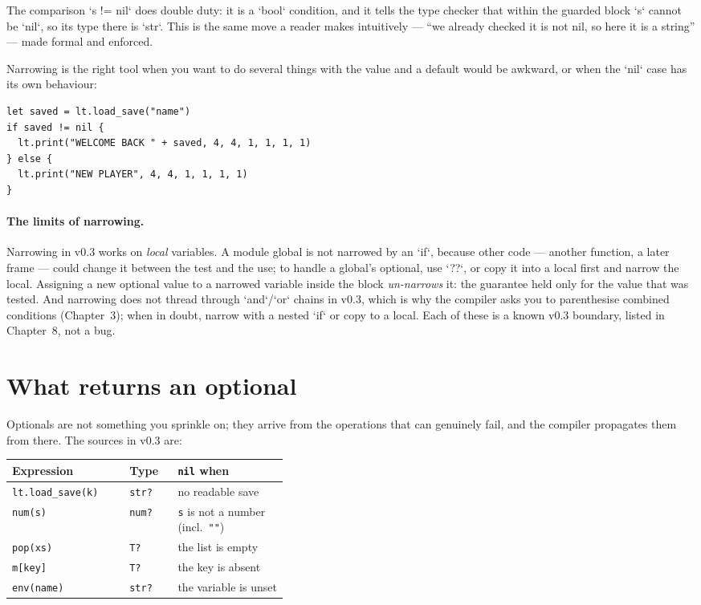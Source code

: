 \noindent
The comparison `s != nil` does double duty: it is a `bool` condition, and it
tells the type checker that within the guarded block `s` cannot be `nil`, so
its type there is `str`. This is the same move a reader makes intuitively ---
``we already checked it is not nil, so here it is a string'' --- made formal
and enforced.

Narrowing is the right tool when you want to do several things with the value
and a default would be awkward, or when the `nil` case has its own behaviour:

\begin{lstlisting}[language=wick]
let saved = lt.load_save("name")
if saved != nil {
  lt.print("WELCOME BACK " + saved, 4, 4, 1, 1, 1, 1)
} else {
  lt.print("NEW PLAYER", 4, 4, 1, 1, 1, 1)
}
\end{lstlisting}

\paragraph{The limits of narrowing.} Narrowing in v0.3 works on \emph{local}
variables. A module global is not narrowed by an `if`, because other code ---
another function, a later frame --- could change it between the test and the
use; to handle a global's optional, use `??`, or copy it into a local first
and narrow the local. Assigning a new optional value to a narrowed variable
inside the block \emph{un-narrows} it: the guarantee held only for the value
that was tested. And narrowing does not thread through `and`/`or` chains in
v0.3, which is why the compiler asks you to parenthesise combined conditions
(Chapter~3); when in doubt, narrow with a nested `if` or copy to a local. Each
of these is a known v0.3 boundary, listed in Chapter~8, not a bug.

\section{What returns an optional}

Optionals are not something you sprinkle on; they arrive from the operations
that can genuinely fail, and the compiler propagates them from there. The
sources in v0.3 are:

\begin{center}
\begin{tabular}{@{}llp{0.40\linewidth}@{}}
\toprule
\textbf{Expression} & \textbf{Type} & \textbf{\texttt{nil} when} \\
\midrule
\texttt{lt.load\_save(k)} & \texttt{str?} & no readable save \\
\texttt{num(s)} & \texttt{num?} & \texttt{s} is not a number (incl.\ \texttt{""}) \\
\texttt{pop(xs)} & \texttt{T?} & the list is empty \\
\texttt{m[key]} & \texttt{T?} & the key is absent \\
\texttt{env(name)} & \texttt{str?} & the variable is unset \\
\bottomrule
\end{tabular}
\end{center}

